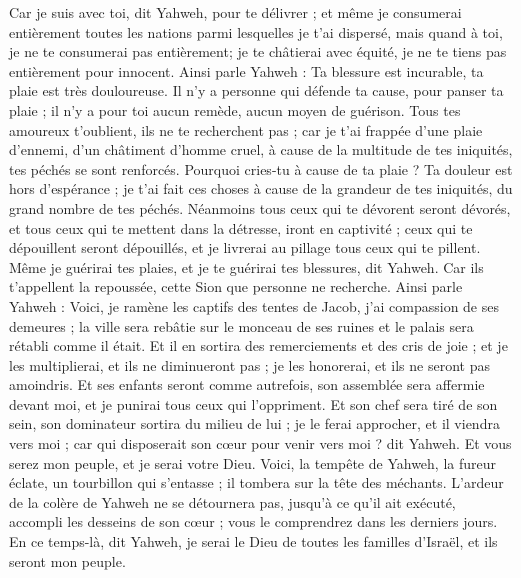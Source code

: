 \begin{multicols}{2}
Car je suis avec toi, dit Yahweh, pour te délivrer ; et même je consumerai entièrement toutes les nations parmi lesquelles je t'ai dispersé, mais quand à toi, je ne te consumerai pas entièrement; je te châtierai avec équité, je ne te tiens pas entièrement pour innocent.
Ainsi parle Yahweh : Ta blessure est incurable, ta plaie est très douloureuse.
Il n'y a personne qui défende ta cause, pour panser ta plaie ; il n'y a pour toi aucun remède, aucun moyen de guérison.
Tous tes amoureux t'oublient, ils ne te recherchent pas ; car je t'ai frappée d'une plaie d'ennemi, d'un châtiment d'homme cruel, à cause de la multitude de tes iniquités, tes péchés se sont renforcés.
Pourquoi cries-tu à cause de ta plaie ? Ta douleur est hors d'espérance ; je t'ai fait ces choses à cause de la grandeur de tes iniquités, du grand nombre de tes péchés.
Néanmoins tous ceux qui te dévorent seront dévorés, et tous ceux qui te mettent dans la détresse, iront en captivité ; ceux qui te dépouillent seront dépouillés, et je livrerai au pillage tous ceux qui te pillent.
Même je guérirai tes plaies, et je te guérirai tes blessures, dit Yahweh. Car ils t'appellent la repoussée, cette Sion que personne ne recherche.
Ainsi parle Yahweh : Voici, je ramène les captifs des tentes de Jacob, j'ai compassion de ses demeures ; la ville sera rebâtie sur le monceau de ses ruines et le palais sera rétabli comme il était.
Et il en sortira des remerciements et des cris de joie ; et je les multiplierai, et ils ne diminueront pas ; je les honorerai, et ils ne seront pas amoindris.
Et ses enfants seront comme autrefois, son assemblée sera affermie devant moi, et je punirai tous ceux qui l'oppriment.
Et son chef sera tiré de son sein, son dominateur sortira du milieu de lui ; je le ferai approcher, et il viendra vers moi ; car qui disposerait son cœur pour venir vers moi ? dit Yahweh.
Et vous serez mon peuple, et je serai votre Dieu.
Voici, la tempête de Yahweh, la fureur éclate, un tourbillon qui s'entasse ; il tombera sur la tête des méchants. 
L'ardeur de la colère de Yahweh ne se détournera pas, jusqu'à ce qu'il ait exécuté, accompli les desseins de son cœur ; vous le comprendrez dans les derniers jours.
\VerseOne{}En ce temps-là, dit Yahweh, je serai le Dieu de toutes les familles d'Israël, et ils seront mon peuple.

\end{multicols}
